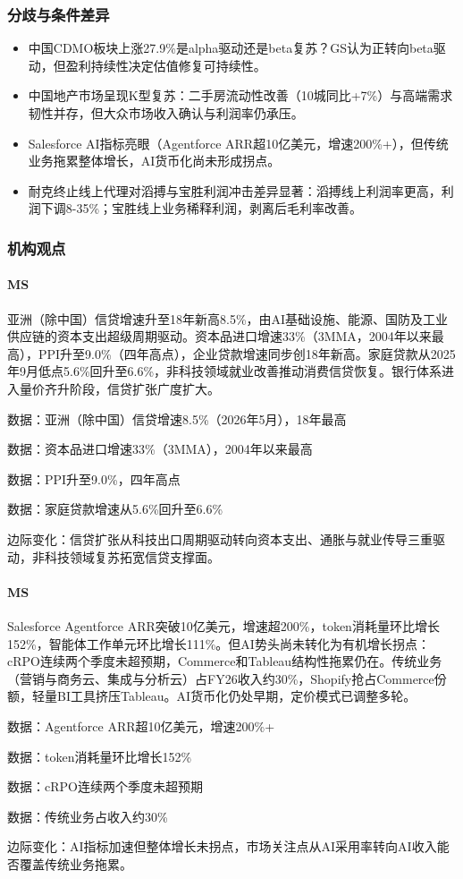 \documentclass[11pt]{ctexart}
\begin{document}
\subsubsection*{分歧与条件差异}
\begin{itemize}
  \item 中国CDMO板块上涨27.9\%是alpha驱动还是beta复苏？GS认为正转向beta驱动，但盈利持续性决定估值修复可持续性。
  \item 中国地产市场呈现K型复苏：二手房流动性改善（10城同比+7\%）与高端需求韧性并存，但大众市场收入确认与利润率仍承压。
  \item Salesforce AI指标亮眼（Agentforce ARR超10亿美元，增速200\%+），但传统业务拖累整体增长，AI货币化尚未形成拐点。
  \item 耐克终止线上代理对滔搏与宝胜利润冲击差异显著：滔搏线上利润率更高，利润下调8-35\%；宝胜线上业务稀释利润，剥离后毛利率改善。
\end{itemize}
\subsubsection*{机构观点}
\paragraph{MS} 亚洲（除中国）信贷增速升至18年新高8.5\%，由AI基础设施、能源、国防及工业供应链的资本支出超级周期驱动。资本品进口增速33\%（3MMA，2004年以来最高），PPI升至9.0\%（四年高点），企业贷款增速同步创18年新高。家庭贷款从2025年9月低点5.6\%回升至6.6\%，非科技领域就业改善推动消费信贷恢复。银行体系进入量价齐升阶段，信贷扩张广度扩大。
{\small\color{refgray}数据：亚洲（除中国）信贷增速8.5\%（2026年5月），18年最高\par}
{\small\color{refgray}数据：资本品进口增速33\%（3MMA），2004年以来最高\par}
{\small\color{refgray}数据：PPI升至9.0\%，四年高点\par}
{\small\color{refgray}数据：家庭贷款增速从5.6\%回升至6.6\%\par}
{\small\color{refgray}边际变化：信贷扩张从科技出口周期驱动转向资本支出、通胀与就业传导三重驱动，非科技领域复苏拓宽信贷支撑面。\par}
\paragraph{MS} Salesforce Agentforce ARR突破10亿美元，增速超200\%，token消耗量环比增长152\%，智能体工作单元环比增长111\%。但AI势头尚未转化为有机增长拐点：cRPO连续两个季度未超预期，Commerce和Tableau结构性拖累仍在。传统业务（营销与商务云、集成与分析云）占FY26收入约30\%，Shopify抢占Commerce份额，轻量BI工具挤压Tableau。AI货币化仍处早期，定价模式已调整多轮。
{\small\color{refgray}数据：Agentforce ARR超10亿美元，增速200\%+\par}
{\small\color{refgray}数据：token消耗量环比增长152\%\par}
{\small\color{refgray}数据：cRPO连续两个季度未超预期\par}
{\small\color{refgray}数据：传统业务占收入约30\%\par}
{\small\color{refgray}边际变化：AI指标加速但整体增长未拐点，市场关注点从AI采用率转向AI收入能否覆盖传统业务拖累。\par}
\end{document}

